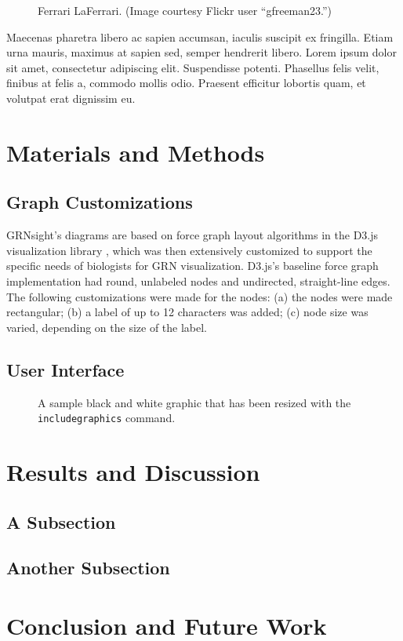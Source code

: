 \documentclass[sigconf,review,anonymous]{acmart}
\begin{document}
\begin{figure}[ht]
  \centering
  \caption{Ferrari LaFerrari. (Image courtesy Flickr user ``gfreeman23.'')}
  \label{fig:ferrari}
\end{figure}

Maecenas pharetra libero ac sapien accumsan, iaculis suscipit ex fringilla. Etiam urna mauris, maximus at sapien sed, semper hendrerit libero. Lorem ipsum dolor sit amet, consectetur adipiscing elit. Suspendisse potenti. Phasellus felis velit, finibus at felis a, commodo mollis odio. Praesent efficitur lobortis quam, et volutpat erat dignissim eu. 

\section{Materials and Methods}

\subsection{Graph Customizations}
GRNsight's diagrams are based on force graph layout algorithms in the D3.js visualization library \cite{d3}, which was then extensively customized to support the specific needs of biologists for GRN visualization. D3.js's baseline force graph implementation had round, unlabeled nodes and undirected, straight-line edges. The following customizations were made for the nodes: (a) the nodes were made rectangular; (b) a label of up to 12 characters was added; (c) node size was varied, depending on the size of the label.

\subsection{User Interface}



\begin{figure}[h]
\caption{A sample black and white graphic that has
been resized with the \texttt{includegraphics} command.}
\end{figure}


\section{Results and Discussion}


\subsection{A Subsection}


\subsection{Another Subsection}

\section{Conclusion and Future Work}



 
\end{document}
